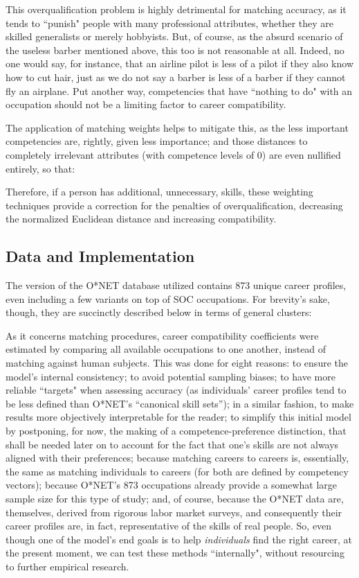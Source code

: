\documentclass{article}
\begin{document}
This overqualification problem is highly detrimental for matching accuracy, as
it tends to ``punish" people with many professional attributes, whether they
are skilled generalists or merely hobbyists. But, of course, as the absurd
scenario of the useless barber mentioned above, this too is not reasonable at
all. Indeed, no one would say, for instance, that an airline pilot is less of a
pilot if they also know how to cut hair, just as we do not say a barber is less
of a barber if they cannot fly an airplane. Put another way, competencies that
have ``nothing to do" with an occupation should not be a limiting factor to
career compatibility.

The application of matching weights helps to mitigate this, as the less
important competencies are, rightly, given less importance; and those distances
to completely irrelevant attributes (with competence levels of 0) are even
nullified entirely, so that: \EqnUnweightedWeightedDistances

Therefore, if a person has additional, unnecessary, skills, these weighting
techniques provide a correction for the penalties of overqualification,
decreasing the normalized Euclidean distance and increasing compatibility.

\subsection{Data and Implementation}
The version of the O*NET database utilized contains 873 unique career profiles,
even including a few variants on top of SOC occupations. For brevity's sake,
though, they are succinctly described below in terms of general clusters:
\GeneralOccupationalStatistics

As it concerns matching procedures, career compatibility coefficients were
estimated by comparing all available occupations to one another, instead of
matching against human subjects. This was done for eight reasons: to ensure the
model's internal consistency; to avoid potential sampling biases; to have more
reliable ``targets" when assessing accuracy (as individuals' career profiles
tend to be less defined than O*NET's ``canonical skill sets''); in a similar
fashion, to make results more objectively interpretable for the reader; to
simplify this initial model by postponing, for now, the making of a
competence-preference distinction, that shall be needed later on to account for
the fact that one's skills are not always aligned with their preferences;
because matching careers to careers is, essentially, the same as matching
individuals to careers (for both are defined by competency vectors); because
O*NET's 873 occupations already provide a somewhat large sample size for this
type of study; and, of course, because the O*NET data are, themselves, derived
from rigorous labor market surveys, and consequently their career profiles are,
in fact, representative of the skills of real people. So, even though one of
the model's end goals is to help \textit{individuals} find the right career, at
the present moment, we can test these methods ``internally", without resourcing
to further empirical research.
\end{document}
